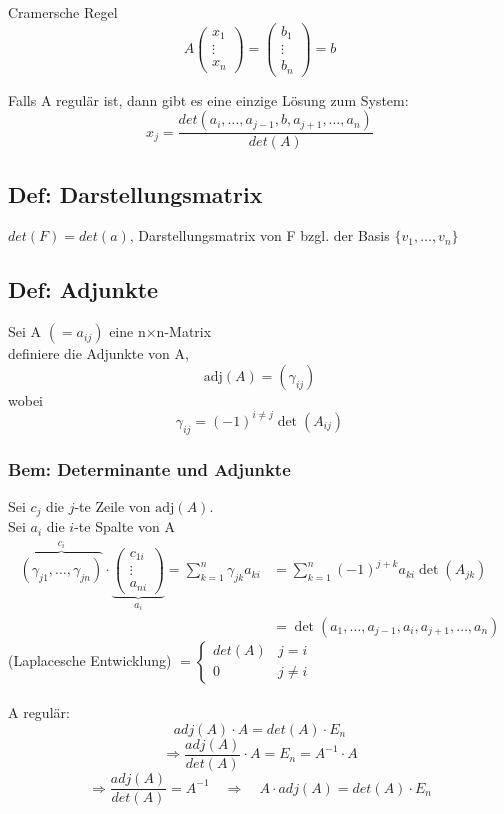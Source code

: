 \documentclass[titlepage,12pt,a4paper,ngerman]{report}
\begin{document}
Cramersche Regel
$$A \begin{pmatrix}
x_1\\
\vdots\\
x_n
\end{pmatrix}
= \begin{pmatrix}
b_1\\
\vdots\\
b_n
\end{pmatrix}
= b
$$

Falls A regulär ist, dann gibt es eine einzige Lösung zum System:
$$ x_j = \frac{det(a_i,\dots,a_{j-1},b,a_{j+1},\dots , a_n)}{det(A)}$$
\subsection{Def: Darstellungsmatrix}
$det(F) = det(a)$, Darstellungsmatrix von F bzgl. der Basis $\{v_1,\dots , v_n\}$
\subsection{Def: Adjunkte} Sei A $(= a_{ij})$ eine n$\times$n-Matrix\\
definiere die Adjunkte von A,  
$$\textrm{adj}(A) = (\gamma_{ij})$$ wobei $$\gamma_{ij} = (-1)^{i\neq j} \det(A_{ij})$$
\subsubsection{Bem: Determinante und Adjunkte}
Sei $c_j$ die $j$-te Zeile von $\textrm{adj}(A)$.\\
Sei $a_i$ die $i$-te Spalte von A 
\begin{align*}\overbrace{(\gamma_{j1}, \dots , \gamma_{jn})}^{c_i} \cdot \underbrace{\begin{pmatrix} c_{1i}\\ \vdots\\ a_{ni} \end{pmatrix}}_{a_i}  = \sum_{k=1}^n \gamma_{jk} a_{ki} &= \sum_{k=1}^n (-1)^{j+k} a_{ki} \det(A_{jk}) \\ &= \det(a_1, \dots , a_{j-1}, a_i , a_{j+1}, \dots , a_n) \end{align*}
(Laplacesche Entwicklung) $ = \left\{\begin{array}{ll} det(A) & j=i \\ 0 & j\neq i \end{array}\right.$\\\\
A regulär:
$$adj(A) \cdot A = det(A) \cdot E_n$$
$$\Rightarrow \frac{adj(A)}{det(A)} \cdot A = E_n = A^{-1} \cdot A$$
$$\Rightarrow \frac{adj(A)}{det(A)} = A^{-1} \quad \Rightarrow \quad A \cdot adj(A) = det(A) \cdot E_n$$
\end{document}
